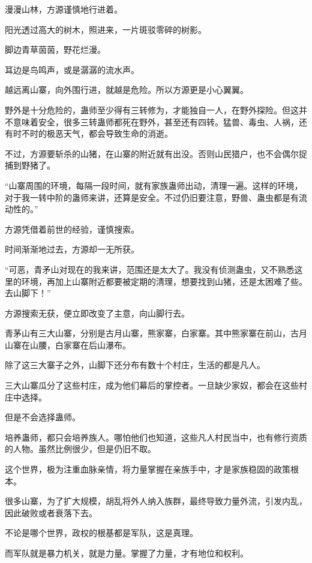 
\begin{this_body}



漫漫山林，方源谨慎地行进着。

阳光透过高大的树木，照进来，一片斑驳零碎的树影。

脚边青草茵茵，野花烂漫。

耳边是鸟鸣声，或是潺潺的流水声。

越远离山寨，向外围行进，就越是危险。所以方源更是小心翼翼。

野外是十分危险的，蛊师至少得有三转修为，才能独自一人，在野外探险。但这并不意味着安全，很多三转蛊师都死在野外，甚至还有四转。猛兽、毒虫、人祸，还有时不时的极恶天气，都会导致生命的消逝。

不过，方源要斩杀的山猪，在山寨的附近就有出没。否则山民猎户，也不会偶尔捉捕到野猪了。

“山寨周围的环境，每隔一段时间，就有家族蛊师出动，清理一遍。这样的环境，对于我一转中阶的蛊师来讲，还算是安全。不过仍旧要注意，野兽、蛊虫都是有流动性的。”

方源凭借着前世的经验，谨慎搜索。

时间渐渐地过去，方源却一无所获。

“可恶，青矛山对现在的我来讲，范围还是太大了。我没有侦测蛊虫，又不熟悉这里的环境，再加上山寨附近都要被定期的清理，想要找到山猪，还是太困难了些。去山脚下！”

方源搜索无获，便立即改变了主意，向山脚行去。

青茅山有三大山寨，分别是古月山寨，熊家寨，白家寨。其中熊家寨在前山，古月山寨在山腰，白家寨在后山瀑布。

除了这三大寨子之外，山脚下还分布有数十个村庄，生活的都是凡人。

三大山寨瓜分了这些村庄，成为他们幕后的掌控者。一旦缺少家奴，都会在这些村庄中选择。

但是不会选择蛊师。

培养蛊师，都只会培养族人。哪怕他们也知道，这些凡人村民当中，也有修行资质的人物。虽然比例很少，但是仍旧不取。

这个世界，极为注重血脉亲情，将力量掌握在亲族手中，才是家族稳固的政策根本。

很多山寨，为了扩大规模，胡乱将外人纳入族群，最终导致力量外流，引发内乱，因此破败或者衰落下去。

不论是哪个世界，政权的根基都是军队，这是真理。

而军队就是暴力机关，就是力量。掌握了力量，才有地位和权利。


\end{this_body}
